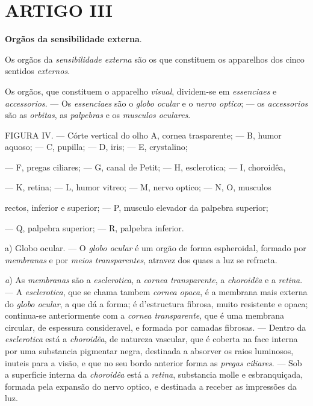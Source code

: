 
\section*{ARTIGO III}

\textbf{Orgãos da sensibilidade externa}.


Os orgãos da \emph{sensibilidade externa} são os que constituem os apparelhos dos cinco sentidos \emph{externos}.


 
Os orgãos, que constituem o apparelho \emph{visual}, dividem-se em \emph{essenciaes} e \emph{accessorios}. --- Os \emph{essenciaes} são o \emph{globo ocular} e o \emph{nervo optico}; --- os \emph{accessorios} são as \emph{orbitas}, as \emph{palpebras} e os \emph{musculos oculares}.

FIGURA IV. --- Córte vertical do olho A, cornea trasparente; --- B, humor aquoso; --- C, pupilla; --- D, iris; --- E, crystalino;

--- F, pregas ciliares; --- G, canal de Petit; --- H, esclerotica; --- I, choroidêa,

--- K, retina; --- L, humor vitreo; --- M, nervo optico; --- N, O, musculos

rectos, inferior e superior; --- P, musculo elevador da palpebra superior;

--- Q, palpebra superior; --- R, palpebra inferior.

a) Globo ocular. --- O \emph{globo ocular} é um orgão de forma espheroidal, formado por \emph{membranas} e por \emph{meios transparentes}, atravez dos quaes a luz se refracta.

\emph{a}) As \emph{membranas} são a \emph{esclerotica}, a \emph{cornea transparente}, a \emph{choroidêa} e a \emph{retina}. --- A \emph{esclerotica}, que se chama tambem \emph{cornea opaca}, é a membrana mais externa do \emph{globo ocular}, a que dá a forma; é d'estructura fibrosa, muito resistente e opaca; continua-se anteriormente com a \emph{cornea transparente}, que é uma membrana circular, de espessura consideravel, e formada por camadas fibrosas. --- Dentro da \emph{esclerotica} está a   \emph{choroidêa}, de natureza vascular, que é coberta na face interna por uma substancia pigmentar negra, destinada a absorver os raios luminosos, inuteis para a visão, e que no seu bordo anterior forma as \emph{pregas ciliares}. --- Sob a superficie interna da \emph{choroidêa} está a \emph{retina}, substancia molle e esbranquiçada, formada pela expansão do nervo optico, e destinada a receber as impressões da luz.

